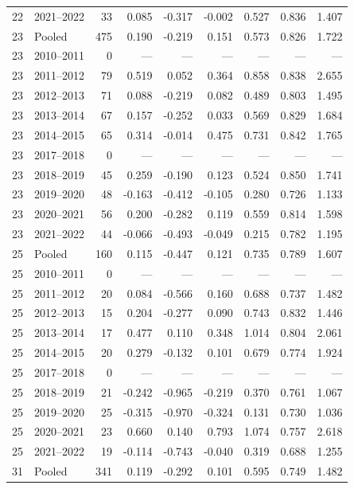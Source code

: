 \begin{longtable}{llrrrrrrr}
22 & 2021--2022 & 33 & 0.085 & -0.317 & -0.002 & 0.527 & 0.836 & 1.407 \\
23 & Pooled & 475 & 0.190 & -0.219 & 0.151 & 0.573 & 0.826 & 1.722 \\
23 & 2010--2011 & 0 & --- & --- & --- & --- & --- & --- \\
23 & 2011--2012 & 79 & 0.519 & 0.052 & 0.364 & 0.858 & 0.838 & 2.655 \\
23 & 2012--2013 & 71 & 0.088 & -0.219 & 0.082 & 0.489 & 0.803 & 1.495 \\
23 & 2013--2014 & 67 & 0.157 & -0.252 & 0.033 & 0.569 & 0.829 & 1.684 \\
23 & 2014--2015 & 65 & 0.314 & -0.014 & 0.475 & 0.731 & 0.842 & 1.765 \\
23 & 2017--2018 & 0 & --- & --- & --- & --- & --- & --- \\
23 & 2018--2019 & 45 & 0.259 & -0.190 & 0.123 & 0.524 & 0.850 & 1.741 \\
23 & 2019--2020 & 48 & -0.163 & -0.412 & -0.105 & 0.280 & 0.726 & 1.133 \\
23 & 2020--2021 & 56 & 0.200 & -0.282 & 0.119 & 0.559 & 0.814 & 1.598 \\
23 & 2021--2022 & 44 & -0.066 & -0.493 & -0.049 & 0.215 & 0.782 & 1.195 \\
25 & Pooled & 160 & 0.115 & -0.447 & 0.121 & 0.735 & 0.789 & 1.607 \\
25 & 2010--2011 & 0 & --- & --- & --- & --- & --- & --- \\
25 & 2011--2012 & 20 & 0.084 & -0.566 & 0.160 & 0.688 & 0.737 & 1.482 \\
25 & 2012--2013 & 15 & 0.204 & -0.277 & 0.090 & 0.743 & 0.832 & 1.446 \\
25 & 2013--2014 & 17 & 0.477 & 0.110 & 0.348 & 1.014 & 0.804 & 2.061 \\
25 & 2014--2015 & 20 & 0.279 & -0.132 & 0.101 & 0.679 & 0.774 & 1.924 \\
25 & 2017--2018 & 0 & --- & --- & --- & --- & --- & --- \\
25 & 2018--2019 & 21 & -0.242 & -0.965 & -0.219 & 0.370 & 0.761 & 1.067 \\
25 & 2019--2020 & 25 & -0.315 & -0.970 & -0.324 & 0.131 & 0.730 & 1.036 \\
25 & 2020--2021 & 23 & 0.660 & 0.140 & 0.793 & 1.074 & 0.757 & 2.618 \\
25 & 2021--2022 & 19 & -0.114 & -0.743 & -0.040 & 0.319 & 0.688 & 1.255 \\
31 & Pooled & 341 & 0.119 & -0.292 & 0.101 & 0.595 & 0.749 & 1.482 \\

\end{longtable}
